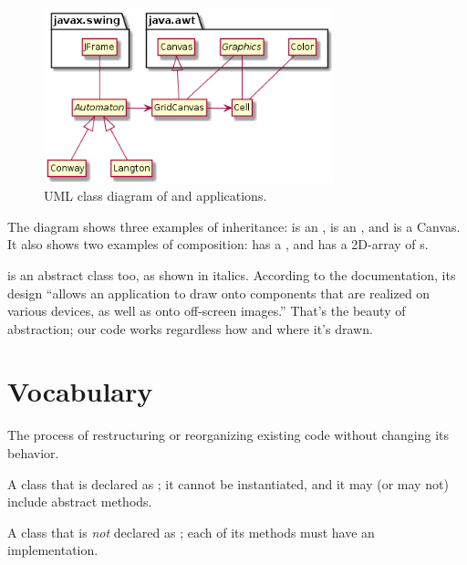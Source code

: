 \begin{figure}[!ht]
\begin{center}
\includegraphics[width=0.75\textwidth]{figs/uml2.png}
\caption{UML class diagram of  and  applications.}
\label{fig:uml2}
\end{center}
\end{figure}


The diagram shows three examples of inheritance:  is an ,  is an , and  is a Canvas.
It also shows two examples of composition:  has a , and  has a 2D-array of s.

 is an abstract class too, as shown in italics.
According to the documentation, its design ``allows an application to draw onto components that are realized on various devices, as well as onto off-screen images.''
That's the beauty of abstraction; our code works regardless how and where it's drawn.


\section{Vocabulary}

\begin{description}

The process of restructuring or reorganizing existing code without changing its behavior.

A class that is declared as ; it cannot be instantiated, and it may (or may not) include abstract methods.

A class that is {\em not} declared as ; each of its methods must have an implementation.

\end{description}


